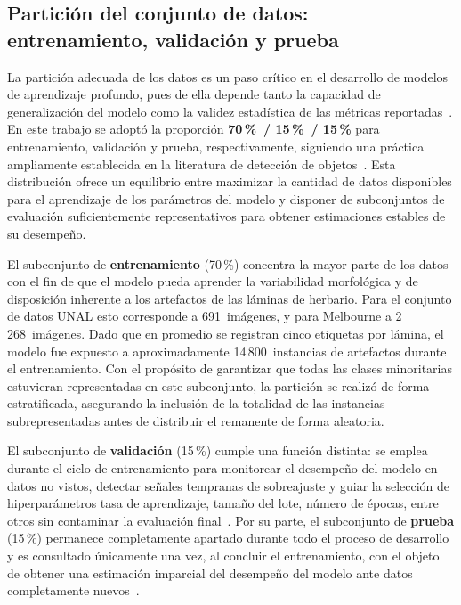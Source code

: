 \subsection{Partición del conjunto de datos: entrenamiento, validación y prueba}
 
La partición adecuada de los datos es un paso crítico en el desarrollo de modelos de
aprendizaje profundo, pues de ella depende tanto la capacidad de generalización del modelo
como la validez estadística de las métricas reportadas~\cite{Goodfellow2016}. En este
trabajo se adoptó la proporción \textbf{70\,\%~/ 15\,\%~/ 15\,\%} para
entrenamiento, validación y prueba, respectivamente, siguiendo una práctica ampliamente
establecida en la literatura de detección de objetos~\cite{everingham2010pascal}. Esta
distribución ofrece un equilibrio entre maximizar la cantidad de datos disponibles para el
aprendizaje de los parámetros del modelo y disponer de subconjuntos de evaluación
suficientemente representativos para obtener estimaciones estables de su desempeño.
 
El subconjunto de \textbf{entrenamiento} (70\,\%) concentra la mayor parte de los datos
con el fin de que el modelo pueda aprender la variabilidad morfológica y de disposición
inherente a los artefactos de las láminas de herbario. Para el conjunto de datos UNAL esto
corresponde a 691~imágenes, y para Melbourne a 2\,268~imágenes. Dado que en promedio se
registran cinco etiquetas por lámina, el modelo fue expuesto a aproximadamente
14\,800~instancias de artefactos durante el entrenamiento. Con el propósito de garantizar
que todas las clases minoritarias estuvieran representadas en este subconjunto,
la partición se realizó de forma estratificada, asegurando la inclusión de la totalidad de
las instancias subrepresentadas antes de distribuir el remanente de forma aleatoria.
 
El subconjunto de \textbf{validación} (15\,\%) cumple una función distinta: se emplea
durante el ciclo de entrenamiento para monitorear el desempeño del modelo en datos no
vistos, detectar señales tempranas de sobreajuste y guiar la selección de
hiperparámetros  tasa de aprendizaje, tamaño del lote, número de épocas, entre otros
sin contaminar la evaluación final~\cite{Goodfellow2016}. Por su parte, el subconjunto de
\textbf{prueba} (15\,\%) permanece completamente apartado durante todo el proceso de
desarrollo y es consultado únicamente una vez, al concluir el entrenamiento, con el objeto
de obtener una estimación imparcial del desempeño del modelo ante datos completamente
nuevos~\cite{everingham2010pascal}.
 

